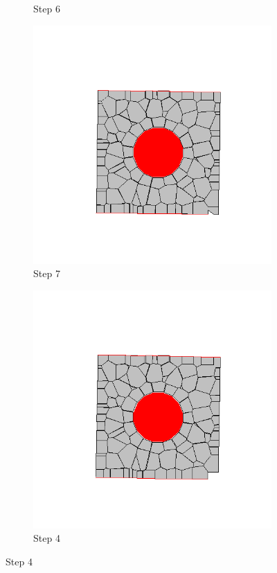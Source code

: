 \begin{figure}[ht!]
\begin{subfigure}{.25\textwidth}
      \caption{Step 6}
      \end{subfigure}%
      \begin{subfigure}{.25\textwidth}
        \centering
        \includegraphics[width=1.0\linewidth]{Files/Small_ASR/CR/DEP5-STEP(007).png}
      \caption{Step 7}
      \end{subfigure}%
      \begin{subfigure}{.25\textwidth}
        \centering
        \includegraphics[width=1.0\linewidth]{Files/Small_ASR/CR/DEP5-STEP(008).png}
      \caption{Step 4}
      \end{subfigure}


\end{figure}
